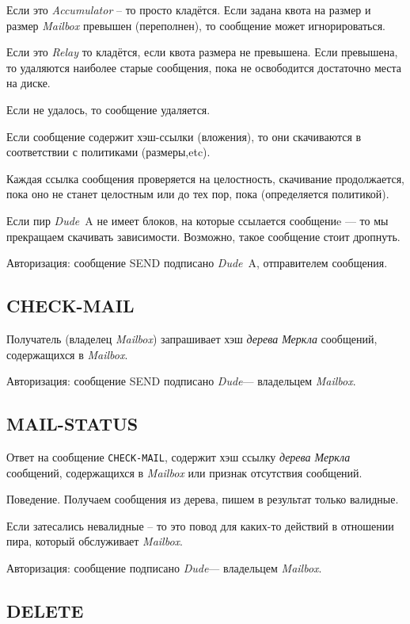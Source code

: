 \documentclass[11pt,a4paper]{article}
\newcommand{\term}[2]{\textit{#2}}
\newcommand{\Relay}{\term{relay}{Relay}}
\newcommand{\Acc}{\term{acc}{Accumulator}}
\newcommand{\Dude}{\term{dude}{Dude}}
\newcommand{\Mailbox}{\term{mailbox}{Mailbox}}
\begin{document}
Если это \Acc{} -- то просто кладётся. Если задана квота на размер и размер
\Mailbox{} превышен (переполнен), то сообщение может игнорироваться.

Если это \Relay{} то кладётся, если квота размера не превышена. Если превышена,
то удаляются наиболее старые сообщения, пока не освободится достаточно места на
диске.

Если не удалось, то сообщение удаляется.

Если сообщение содержит хэш-ссылки (вложения), то они скачиваются в соответствии
с политиками (размеры,etc).

Каждая ссылка сообщения проверяется на целостность, скачивание продолжается,
пока оно не станет целостным или до тех пор, пока (определяется политикой).

Если пир \Dude~A не имеет блоков, на которые ссылается сообщениe --- то мы
прекращаем скачивать зависимости. Возможно, такое сообщение стоит дропнуть.

Авторизация: сообщение SEND подписано \Dude~A, отправителем сообщения.

\subsection{CHECK-MAIL}

Получатель (владелец \Mailbox{}) запрашивает хэш \term{merkle}{дерева Меркла} сообщений,
содержащихся в \Mailbox{}.

Авторизация: сообщение SEND подписано \Dude --- владельцем \Mailbox{}.

\subsection{MAIL-STATUS}

Ответ на сообщение \texttt{CHECK-MAIL}, содержит хэш ссылку
\term{merkle}{дерева Меркла} сообщений, содержащихся в \Mailbox{}
или признак отсутствия сообщений.

Поведение. Получаем сообщения из дерева, пишем в результат только валидные.

Если затесались невалидные -- то это повод для каких-то действий в отношении
пира, который обслуживает \Mailbox{}.

Авторизация: сообщение подписано \Dude --- владельцем  \Mailbox{}.

\subsection{DELETE}
\end{document}
